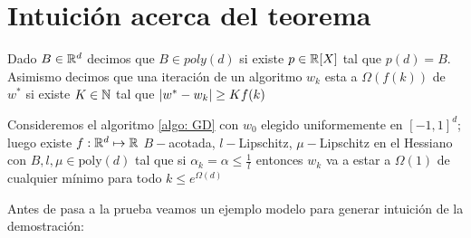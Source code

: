 \section{Intuici\'on acerca del teorema}

\begin{definition}
	Dado $B \in {\mathbb{R}}^d$ decimos que $B \in poly(d)$ si existe $p \in {\mathbb{R}}[X]$ tal que $p(d) = B$.
	Asimismo decimos que una iteraci\'on de un algoritmo $w_k$ esta a $\Omega(f(k))$ de $w^*$ si existe $K \in {\mathbb{N}}$ tal que $\left\lvert w^* - w_k\right\rvert \geq Kf(k)$
\end{definition}

\begin{theorem}
	Consideremos el algoritmo \ref{algo: GD} con $w_0$ elegido uniformemente en $[-1,1]^d$; luego existe $f : {\mathbb{R}}^d \mapsto {\mathbb{R}}$ $B-$acotada, $l-$Lipschitz, $\mu-$Lipschitz en el Hessiano con $B,l,\mu \in \text{poly}(d)$ tal que si $\alpha_k = \alpha \leq \frac{1}{l}$ entonces $w_k$ va a estar a $\Omega(1)$ de cualquier m\'inimo para todo $k \leq e^{\Omega(d)}$
\end{theorem}

Antes de pasa a la prueba veamos un ejemplo modelo para generar intuici\'on de la demostraci\'on:


